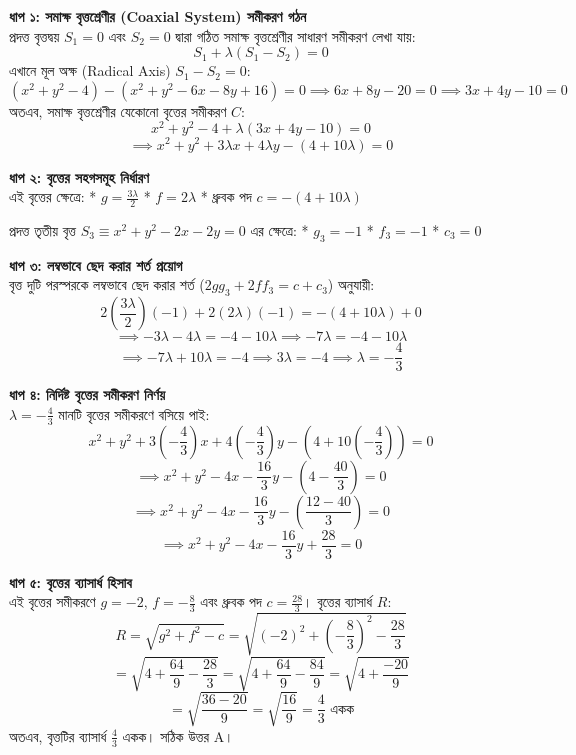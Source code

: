 \documentclass[12pt, a4paper]{article}
\begin{document}
\begin{tcolorbox}[solutionbox={সমাধান (Solution)}]
    \noindent
    \textbf{ধাপ ১: সমাক্ষ বৃত্তশ্রেণীর (Coaxial System) সমীকরণ গঠন} \\
    প্রদত্ত বৃত্তদ্বয় $S_1 = 0$ এবং $S_2 = 0$ দ্বারা গঠিত সমাক্ষ বৃত্তশ্রেণীর সাধারণ সমীকরণ লেখা যায়:
    \[ S_1 + \lambda(S_1 - S_2) = 0 \]
    এখানে মূল অক্ষ (Radical Axis) $S_1 - S_2 = 0$:
    \[ (x^2 + y^2 - 4) - (x^2 + y^2 - 6x - 8y + 16) = 0 \implies 6x + 8y - 20 = 0 \implies 3x + 4y - 10 = 0 \]
    অতএব, সমাক্ষ বৃত্তশ্রেণীর যেকোনো বৃত্তের সমীকরণ $C$:
    \[ x^2 + y^2 - 4 + \lambda(3x + 4y - 10) = 0 \]
    \[ \implies x^2 + y^2 + 3\lambda x + 4\lambda y - (4 + 10\lambda) = 0 \]
    
    \vspace{0.5em}
    \noindent\textbf{ধাপ ২: বৃত্তের সহগসমূহ নির্ধারণ} \\
    এই বৃত্তের ক্ষেত্রে:
    * $g = \frac{3\lambda}{2}$
    * $f = 2\lambda$
    * ধ্রুবক পদ $c = -(4 + 10\lambda)$
    
    প্রদত্ত তৃতীয় বৃত্ত $S_3 \equiv x^2 + y^2 - 2x - 2y = 0$ এর ক্ষেত্রে:
    * $g_3 = -1$
    * $f_3 = -1$
    * $c_3 = 0$
    
    \vspace{0.5em}
    \noindent\textbf{ধাপ ৩: লম্বভাবে ছেদ করার শর্ত প্রয়োগ} \\
    বৃত্ত দুটি পরস্পরকে লম্বভাবে ছেদ করার শর্ত ($2g g_3 + 2f f_3 = c + c_3$) অনুযায়ী:
    \[ 2\left(\frac{3\lambda}{2}\right)(-1) + 2(2\lambda)(-1) = -(4 + 10\lambda) + 0 \]
    \[ \implies -3\lambda - 4\lambda = -4 - 10\lambda \implies -7\lambda = -4 - 10\lambda \]
    \[ \implies -7\lambda + 10\lambda = -4 \implies 3\lambda = -4 \implies \lambda = -\frac{4}{3} \]
    
    \vspace{0.5em}
    \noindent\textbf{ধাপ ৪: নির্দিষ্ট বৃত্তের সমীকরণ নির্ণয়} \\
    $\lambda = -\frac{4}{3}$ মানটি বৃত্তের সমীকরণে বসিয়ে পাই:
    \[ x^2 + y^2 + 3\left(-\frac{4}{3}\right)x + 4\left(-\frac{4}{3}\right)y - \left(4 + 10\left(-\frac{4}{3}\right)\right) = 0 \]
    \[ \implies x^2 + y^2 - 4x - \frac{16}{3}y - \left(4 - \frac{40}{3}\right) = 0 \]
    \[ \implies x^2 + y^2 - 4x - \frac{16}{3}y - \left(\frac{12 - 40}{3}\right) = 0 \]
    \[ \implies x^2 + y^2 - 4x - \frac{16}{3}y + \frac{28}{3} = 0 \]
    
    \vspace{0.5em}
    \noindent\textbf{ধাপ ৫: বৃত্তের ব্যাসার্ধ হিসাব} \\
    এই বৃত্তের সমীকরণে $g = -2$, $f = -\frac{8}{3}$ এবং ধ্রুবক পদ $c = \frac{28}{3}$। 
    বৃত্তের ব্যাসার্ধ $R$:
    \[ R = \sqrt{g^2 + f^2 - c} = \sqrt{(-2)^2 + \left(-\frac{8}{3}\right)^2 - \frac{28}{3}} \]
    \[ = \sqrt{4 + \frac{64}{9} - \frac{28}{3}} = \sqrt{4 + \frac{64}{9} - \frac{84}{9}} = \sqrt{4 + \frac{-20}{9}} \]
    \[ = \sqrt{\frac{36 - 20}{9}} = \sqrt{\frac{16}{9}} = \frac{4}{3} \text{ একক} \]
    অতএব, বৃত্তটির ব্যাসার্ধ $\frac{4}{3}$ একক। 
    সঠিক উত্তর A।
\end{tcolorbox}
\end{document}
